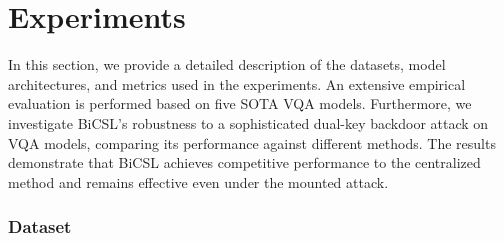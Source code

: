 \documentclass[letterpaper]{article} %
\begin{document}


\section{Experiments}

In this section, we provide a detailed description of the datasets, model architectures, and metrics used in the experiments. An extensive empirical evaluation is performed based on five SOTA VQA models. Furthermore, we investigate BiCSL's robustness to a sophisticated dual-key backdoor attack on VQA models, comparing its performance against different methods. The results demonstrate that BiCSL achieves competitive performance to the centralized method and remains effective even under the mounted attack.

\subsubsection{Dataset}
\end{document}
